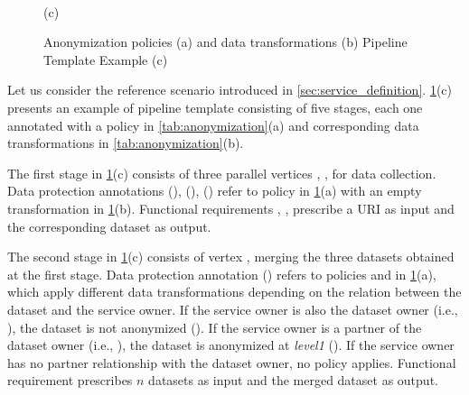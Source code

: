 \begin{figure}[ht!]
{
  }
  \\
  \footnotesize(c)
  \caption{Anonymization policies (a) and data transformations (b) Pipeline Template Example (c)}\label{tab:anonymization}
  \label{fig:service_composition_template}
\end{figure}

\begin{example}[\bf \pipelineTemplate]\label{ex:template}
  Let us consider the reference scenario introduced in \cref{sec:service_definition}.
  {\color{OurColor}\cref{fig:service_composition_template}(c) presents an example of pipeline template consisting of five stages, each one annotated with a policy in \cref{tab:anonymization}(a) and corresponding data transformations in \cref{tab:anonymization}(b).}

  The first stage in \cref{fig:service_composition_template}(c) consists of three parallel vertices , ,  for data collection.
  Data protection annotations \myLambda(), \myLambda(), \myLambda() refer to policy  in \cref{fig:service_composition_template}(a) with an empty transformation  in \cref{fig:service_composition_template}(b).
  Functional requirements , ,   prescribe a URI as input and the corresponding dataset as output.

  The second stage in \cref{fig:service_composition_template}(c) consists of vertex , merging the three datasets obtained at the first stage. Data protection annotation \myLambda() refers to policies  and  in \cref{fig:service_composition_template}(a), which apply different data transformations depending on the relation between the dataset and the service owner.
  If the service owner is also the dataset owner (i.e., \pone), the dataset is not anonymized (). If the service owner is a partner of the dataset owner (i.e., \ptwo), the dataset is anonymized at \emph{level1} (). If the service owner has no partner relationship with the dataset owner, no policy applies.
  Functional requirement  prescribes $n$ datasets as input and the merged dataset as output.


\end{example}
